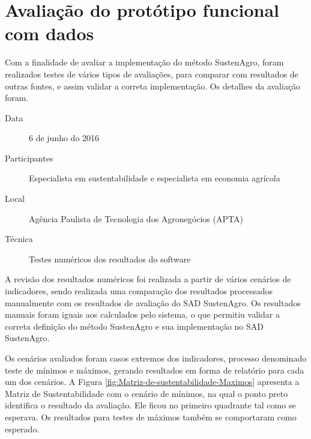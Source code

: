\section{Avaliação do protótipo funcional com dados}

Com a finalidade de avaliar a implementação do método SustenAgro,
foram realizados testes de vários tipos de avaliações, para comparar
com resultados de outras fontes, e assim validar a correta implementação.
Os detalhes da avaliação foram.
\begin{description}
\item [{Data}] 6 de junho do 2016
\item [{Participantes}] Especialista em sustentabilidade e especialista
em economia agrícola
\item [{Local}] Agência Paulista de Tecnologia dos Agronegócios (APTA)
\item [{Técnica}] Testes numéricos dos resultados do software
\end{description}
A revisão dos resultados numéricos foi realizada a partir de vários
cenários de indicadores, sendo realizada uma comparação dos resultados
processados manualmente com os resultados de avaliação do SAD SustenAgro.
Os resultados manuais foram iguais aos calculados pelo sistema, o
que permitiu validar a correta definição do método SustenAgro e sua
implementação no SAD SustenAgro. 

Os cenários avaliados foram casos extremos dos indicadores, processo
denominado teste de mínimos e máximos, gerando resultados em forma
de relatório para cada um dos cenários. A Figura \ref{fig:Matriz-de-sustentabilidade-Maximos}
apresenta a Matriz de Sustentabilidade com o cenário de mínimos, na
qual o ponto preto identifica o resultado da avaliação. Ele ficou
no primeiro quadrante tal como se esperava. Os resultados para testes
de máximos também se comportaram como esperado.

